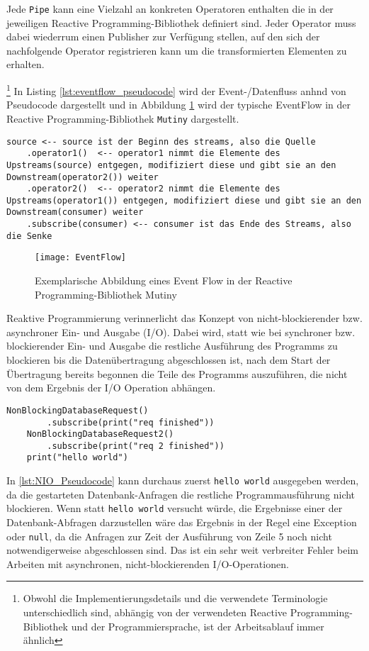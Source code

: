 Jede \verb|Pipe| kann eine Vielzahl an konkreten Operatoren enthalten die in der jeweiligen Reactive Programming-Bibliothek definiert sind.
Jeder Operator muss dabei wiederrum einen Publisher zur Verfügung stellen, auf den sich der nachfolgende Operator registrieren kann
um die transformierten Elementen zu erhalten.

\footnote{Obwohl die Implementierungsdetails und die verwendete Terminologie unterschiedlich sind, abhängig von der verwendeten Reactive Programming-Bibliothek
	und der Programmiersprache, ist der Arbeitsablauf immer ähnlich}
In Listing \ref{lst:eventflow_pseudocode} wird der Event-/Datenfluss anhnd von Pseudocode dargestellt und in Abbildung \ref{fig:eventflow_mutiny}
wird der typische EventFlow in der Reactive Programming-Bibliothek \verb|Mutiny| dargestellt.
\begin{lstlisting}[caption=Pseudocode Event-/Datenfluss, captionpos=b, label=lst:eventflow_pseudocode]
source <-- source ist der Beginn des streams, also die Quelle
	.operator1()  <-- operator1 nimmt die Elemente des Upstreams(source) entgegen, modifiziert diese und gibt sie an den Downstream(operator2()) weiter
	.operator2()  <-- operator2 nimmt die Elemente des Upstreams(operator1()) entgegen, modifiziert diese und gibt sie an den Downstream(consumer) weiter
	.subscribe(consumer) <-- consumer ist das Ende des Streams, also die Senke
\end{lstlisting}

\begin{figure}[h!]
	\centering
	\texttt{[image: EventFlow]}
	\caption{Exemplarische Abbildung eines Event Flow in der Reactive Programming-Bibliothek Mutiny \parencite{MutinyEventFlow}}
	\label{fig:eventflow_mutiny}
\end{figure}

Reaktive Programmierung verinnerlicht das Konzept von nicht-blockierender bzw. asynchroner Ein- und Ausgabe (I/O).
Dabei wird, statt wie bei synchroner bzw. blockierender Ein- und Ausgabe die restliche Ausführung des Programms
zu blockieren bis die Datenübertragung abgeschlossen ist, nach dem Start der Übertragung bereits begonnen die Teile des
Programms auszuführen, die nicht von dem Ergebnis der I/O Operation abhängen.

\begin{lstlisting}[caption=Pseudocode Nonblocking I/O (NIO), captionpos=b, label=lst:NIO_Pseudocode]
	NonBlockingDatabaseRequest()
		.subscribe(print("req finished"))
	NonBlockingDatabaseRequest2()
		.subscribe(print("req 2 finished"))
	print("hello world")
\end{lstlisting}
In \ref{lst:NIO_Pseudocode} kann durchaus zuerst \verb|hello world| ausgegeben werden, da die gestarteten Datenbank-Anfragen die
restliche Programmausführung nicht blockieren. Wenn statt \verb|hello world| versucht würde, die Ergebnisse einer der Datenbank-Abfragen
darzustellen wäre das Ergebnis in der Regel eine Exception oder \verb|null|, da die Anfragen zur Zeit der Ausführung von Zeile 5 noch nicht notwendigerweise
abgeschlossen sind. Das ist ein sehr weit verbreiter Fehler beim Arbeiten mit asynchronen, nicht-blockierenden I/O-Operationen.

